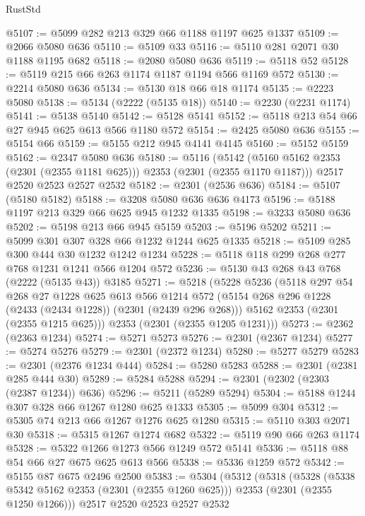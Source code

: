 \begin{lexlean}{RustStd}
\begin{coremodule}
@5107 := @5099 @282 @213 @329 @66 @1188 @1197 @625 @1337
@5109 := @2066 @5080 @636
@5110 := @5109 @33
@5116 := @5110 @281 @2071 @30 @1188 @1195 @682
@5118 := @2080 @5080 @636
@5119 := @5118 @52
@5128 := @5119 @215 @66 @263 @1174 @1187 @1194 @566 @1169 @572
@5130 := @2214 @5080 @636
@5134 := @5130 @18 @66 @18 @1174
@5135 := @2223 @5080
@5138 := @5134 (@2222 (@5135 @18))
@5140 := @2230 (@2231 @1174)
@5141 := @5138 @5140
@5142 := @5128 @5141
@5152 := @5118 @213 @54 @66 @27 @945 @625 @613 @566 @1180 @572
@5154 := @2425 @5080 @636
@5155 := @5154 @66
@5159 := @5155 @212 @945 @4141 @4145
@5160 := @5152 @5159
@5162 := @2347 @5080 @636
@5180 := @5116
    (@5142 (@5160 @5162 @2353 (@2301 (@2355 @1181 @625))) @2353 (@2301 (@2355 @1170 @1187)))
    @2517
    @2520
    @2523
    @2527
    @2532
@5182 := @2301 (@2536 @636)
@5184 := @5107 (@5180 @5182)
@5188 := @3208 @5080 @636 @636 @4173
@5196 := @5188 @1197 @213 @329 @66 @625 @945 @1232 @1335
@5198 := @3233 @5080 @636
@5202 := @5198 @213 @66 @945 @5159
@5203 := @5196 @5202
@5211 := @5099 @301 @307 @328 @66 @1232 @1244 @625 @1335
@5218 := @5109 @285 @300 @444 @30 @1232 @1242 @1234
@5228 := @5118 @118 @299 @268 @277 @768 @1231 @1241 @566 @1204 @572
@5236 := @5130 @43 @268 @43 @768 (@2222 (@5135 @43)) @3185
@5271 := @5218
    (@5228
      @5236
      (@5118
        @297
        @54
        @268
        @27
        @1228
        @625
        @613
        @566
        @1214
        @572
        (@5154 @268 @296 @1228 (@2433 (@2434 @1228)) (@2301 (@2439 @296 @268)))
        @5162
        @2353
        (@2301 (@2355 @1215 @625)))
      @2353
      (@2301 (@2355 @1205 @1231)))
@5273 := @2362 (@2363 @1234)
@5274 := @5271 @5273
@5276 := @2301 (@2367 @1234)
@5277 := @5274 @5276
@5279 := @2301 (@2372 @1234)
@5280 := @5277 @5279
@5283 := @2301 (@2376 @1234 @444)
@5284 := @5280 @5283
@5288 := @2301 (@2381 @285 @444 @30)
@5289 := @5284 @5288
@5294 := @2301 (@2302 (@2303 (@2387 @1234)) @636)
@5296 := @5211 (@5289 @5294)
@5304 := @5188 @1244 @307 @328 @66 @1267 @1280 @625 @1333
@5305 := @5099 @304
@5312 := @5305 @74 @213 @66 @1267 @1276 @625 @1280
@5315 := @5110 @303 @2071 @30
@5318 := @5315 @1267 @1274 @682
@5322 := @5119 @90 @66 @263 @1174
@5328 := @5322 @1266 @1273 @566 @1249 @572 @5141
@5336 := @5118 @88 @54 @66 @27 @675 @625 @613 @566
@5338 := @5336 @1259 @572
@5342 := @5155 @87 @675 @2496 @2500
@5383 := @5304
    (@5312
      (@5318
        (@5328
          (@5338 @5342 @5162 @2353 (@2301 (@2355 @1260 @625)))
          @2353
          (@2301 (@2355 @1250 @1266)))
        @2517
        @2520
        @2523
        @2527
        @2532

\end{coremodule}
\end{lexlean}

